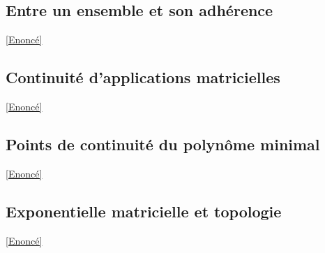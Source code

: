 \documentclass{book}
\begin{document}
	\subsection{Entre un ensemble et son adhérence}
	\label{sec:entre-un-ensemble-et-son-adherence}
	\textcolor{blue}{\hyperref[Entre un ensemble et son aadhérence]{[Enoncé]}}\\
	
	\subsection{Continuité d'applications matricielles}
	\label{sec:continuite-dapplications-matricielles}
	\textcolor{blue}{\hyperref[Continuité d'applicaiton matricielles]{[Enoncé]}}\\
	
	\subsection{Points de continuité du polynôme minimal}\label{sec:points-de-continuite-du-polynome-minimal}
	\textcolor{blue}{\hyperref[Points de continuité du polynôme minimal]{[Enoncé]}}\\
	
	\subsection{Exponentielle matricielle et topologie}\label{sec:exponentielle-matricielle-et-topologie}
	\textcolor{blue}{\hyperref[Exponentielle matricielle et topologie]{[Enoncé]}}\\
	
\end{document}
